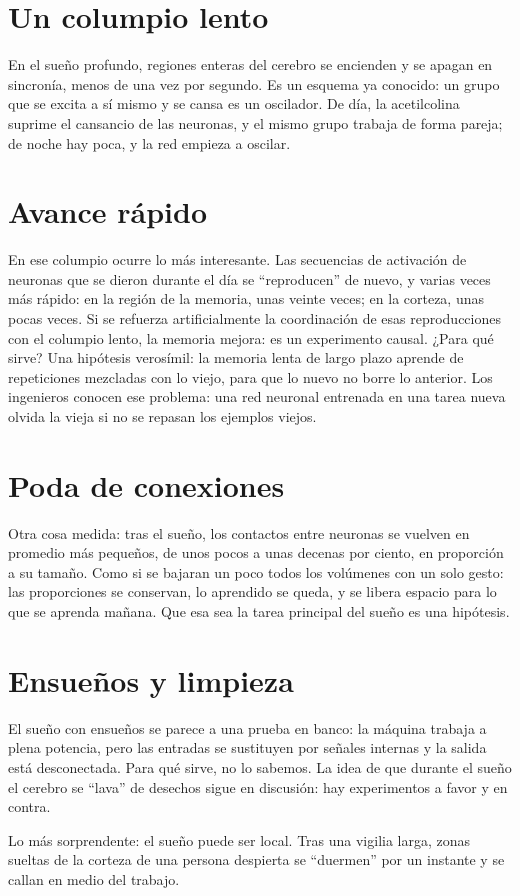 \section*{Un columpio lento}

En el sueño profundo, regiones enteras del cerebro se encienden y se apagan en sincronía, menos de una vez por segundo. Es un esquema ya conocido: un grupo que se excita a sí mismo y se cansa es un oscilador. De día, la acetilcolina suprime el cansancio de las neuronas, y el mismo grupo trabaja de forma pareja; de noche hay poca, y la red empieza a oscilar.


\section*{Avance rápido}

En ese columpio ocurre lo más interesante. Las secuencias de activación de neuronas que se dieron durante el día se “reproducen” de nuevo, y varias veces más rápido: en la región de la memoria, unas veinte veces; en la corteza, unas pocas veces. Si se refuerza artificialmente la coordinación de esas reproducciones con el columpio lento, la memoria mejora: es un experimento causal. ¿Para qué sirve? Una hipótesis verosímil: la memoria lenta de largo plazo aprende de repeticiones mezcladas con lo viejo, para que lo nuevo no borre lo anterior. Los ingenieros conocen ese problema: una red neuronal entrenada en una tarea nueva olvida la vieja si no se repasan los ejemplos viejos.

\section*{Poda de conexiones}

Otra cosa medida: tras el sueño, los contactos entre neuronas se vuelven en promedio más pequeños, de unos pocos a unas decenas por ciento, en proporción a su tamaño. Como si se bajaran un poco todos los volúmenes con un solo gesto: las proporciones se conservan, lo aprendido se queda, y se libera espacio para lo que se aprenda mañana. Que esa sea la tarea principal del sueño es una hipótesis.

\section*{Ensueños y limpieza}

El sueño con ensueños se parece a una prueba en banco: la máquina trabaja a plena potencia, pero las entradas se sustituyen por señales internas y la salida está desconectada. Para qué sirve, no lo sabemos. La idea de que durante el sueño el cerebro se “lava” de desechos sigue en discusión: hay experimentos a favor y en contra.

Lo más sorprendente: el sueño puede ser local. Tras una vigilia larga, zonas sueltas de la corteza de una persona despierta se “duermen” por un instante y se callan en medio del trabajo.

